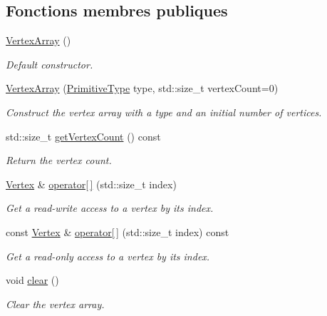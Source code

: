 \subsection*{Fonctions membres publiques}
\begin{DoxyCompactItemize}
\item 
\hyperlink{classsf_1_1VertexArray_a15729e01df8fc0021f9774dfb56295c1}{Vertex\+Array} ()
\begin{DoxyCompactList}\small\item\em Default constructor. \end{DoxyCompactList}\item 
\hyperlink{classsf_1_1VertexArray_a4bb1c29a0e3354a035075899d84f02f9}{Vertex\+Array} (\hyperlink{group__graphics_ga5ee56ac1339984909610713096283b1b}{Primitive\+Type} type, std\+::size\+\_\+t vertex\+Count=0)
\begin{DoxyCompactList}\small\item\em Construct the vertex array with a type and an initial number of vertices. \end{DoxyCompactList}\item 
std\+::size\+\_\+t \hyperlink{classsf_1_1VertexArray_abda90e8d841a273d93164f0c0032bd8d}{get\+Vertex\+Count} () const
\begin{DoxyCompactList}\small\item\em Return the vertex count. \end{DoxyCompactList}\item 
\hyperlink{classsf_1_1Vertex}{Vertex} \& \hyperlink{classsf_1_1VertexArray_a6006676417d91f42d0278f1abcfe4352}{operator\mbox{[}$\,$\mbox{]}} (std\+::size\+\_\+t index)
\begin{DoxyCompactList}\small\item\em Get a read-\/write access to a vertex by its index. \end{DoxyCompactList}\item 
const \hyperlink{classsf_1_1Vertex}{Vertex} \& \hyperlink{classsf_1_1VertexArray_a6bfcf91c01c754e86ee8b44b6c79441b}{operator\mbox{[}$\,$\mbox{]}} (std\+::size\+\_\+t index) const
\begin{DoxyCompactList}\small\item\em Get a read-\/only access to a vertex by its index. \end{DoxyCompactList}\item 
void \hyperlink{classsf_1_1VertexArray_a3654c424aca1f9e468f369bc777c839c}{clear} ()
\begin{DoxyCompactList}\small\item\em Clear the vertex array. \end{DoxyCompactList}\item 

\end{DoxyCompactItemize}
